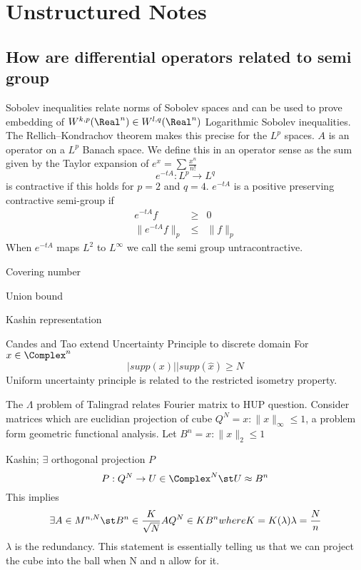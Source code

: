 \chapter{Unstructured Notes}

\section{How are differential operators related to semi group}
Sobolev inequalities relate norms of Sobolev spaces and can be used to prove embedding of $W^{k,p}(\Real^n) \in W^{l,q}(\Real^n)$ Logarithmic Sobolev inequalities.  The Rellich–Kondrachov theorem makes this precise for the $L^p$ spaces.
$A$ is an operator on a $L^p$ Banach space. We define this in an operator sense as the sum given by the Taylor expansion of $e^x = \sum \frac{x^n}{n!}$
\begin{equation*}
  e^{-t A} : L^p \rightarrow L^q
\end{equation*} is contractive if this holds for $p=2$ and $q=4$.
$e^{-t A}$ is a positive preserving contractive semi-group if
\begin{eqnarray*}
  e^{-t A} f &\geq& 0 \\
  \parallel e^{-t A} f \parallel_p &\leq& \parallel f \parallel_p
\end{eqnarray*}
When $e^{-t A}$ maps $L^2$ to $L^\infty$ we call the semi group untracontractive.

Covering number

Union bound

Kashin representation

Candes and Tao extend Uncertainty Principle to discrete domain
For $x \in \Complex^n$
\begin{equation*}
  |supp(x)| |supp(\hat{x}) \geq N
\end{equation*}
Uniform uncertainty principle is related to the restricted isometry property.

The $\Lambda$ problem of Talingrad relates Fourier matrix to HUP question.  Consider matrices which are euclidian projection of cube $Q^N = {x : \parallel x \parallel_\infty  \leq 1}$, a problem form geometric functional analysis.  Let $B^n = {x : \parallel x \parallel_2  \leq 1}$

Kashin; $\exists$ orthogonal projection $P$
\begin{equation*}
  P : Q^N \rightarrow U \in \Complex^N \st U \approx B^n
\end{equation*}
This implies
\begin{equation*}
  \exists A \in M^{n,N} \st B^n \in \frac{K}{\sqrt{N}} A Q^N \in K B^n where K = K(\lambda) \lambda=\frac{N}{n}
\end{equation*}
$\lambda$ is the redundancy.  This statement is essentially telling us that we can project the cube into the ball when N and n allow for it.

